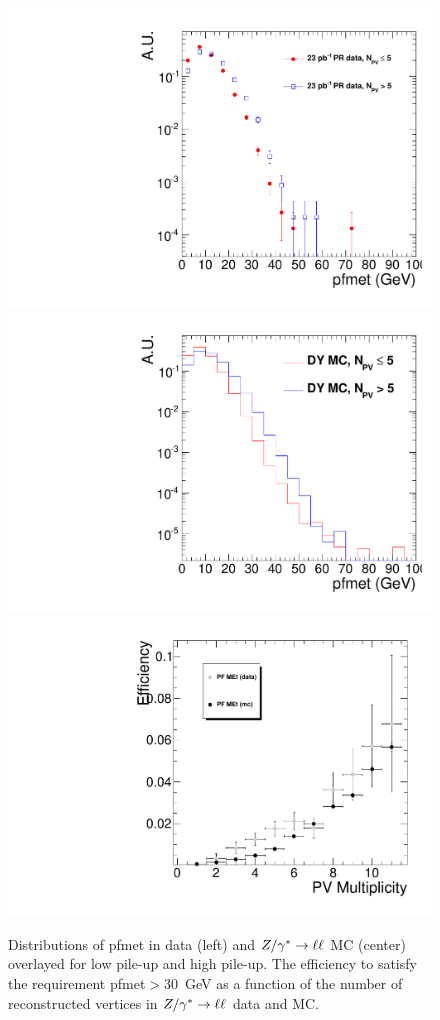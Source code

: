 \begin{figure}[hbt]
\begin{center}
\includegraphics[width=0.3\linewidth]{figures/pfmet_data.pdf} 
\includegraphics[width=0.3\linewidth]{figures/pfmet_dymc.pdf}
\includegraphics[width=0.3\linewidth]{figures/pfmet_Eff30.pdf} 
\caption{\label{fig:met_pu}\protect Distributions of pfmet in data (left) and $Z/\gamma^*\to\ell\ell$ MC (center) 
overlayed for low pile-up and high pile-up. The efficiency to satisfy the requirement pfmet$>30$~GeV as a function
of the number of reconstructed vertices in $Z/\gamma^*\to\ell\ell$ data and MC.}
\end{center}
\end{figure}

